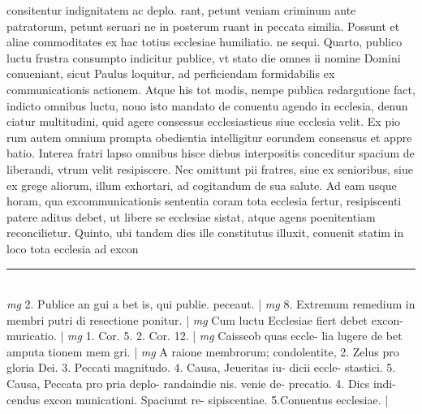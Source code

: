 \documentclass{article}
\begin{document}
\begin{pages}
consitentur indignitatem ac deplo. rant, petunt veniam criminum ante patratorum, petunt seruari ne in posterum ruant in peccata similia. Possunt et aliae commoditates ex hac totius ecclesiae humiliatio. ne sequi.  \pend\pstart Quarto, publico luctu frustra consumpto indicitur publice, vt stato die omnes ii nomine Domini conueniant, sicut Paulus loquitur, ad perficiendam formidabilis ex communicationis actionem. Atque  his tot modis, nempe publica redargutione fact, indicto omnibus luctu, nouo isto mandato de conuentu agendo in ecclesia, denun ciatur multitudini, quid agere consessus ecclesiastieus siue ecclesia velit. Ex pio rum autem omnium prompta obedientia intelligitur eorundem consensus et appre batio. Interea fratri lapso omnibus hisce diebus interpositis conceditur spacium de liberandi, vtrum velit resipiscere. Nec omittunt pii fratres, siue ex senioribus, siue ex grege aliorum, illum exhortari, ad cogitandum de sua salute. Ad eam usque  horam, qua excommunicationis sententia coram tota ecclesia fertur, resipiscenti patere aditus debet, ut libere se ecclesiae sistat, atque agens poenitentiam reconcilietur. Quinto, ubi tandem dies ille constitutus illuxit, conuenit statim in loco tota ecclesia ad excon  \pend
\vspace{0.5cm}\noindent
\vspace{0.2cm}\rule{1cm}{0.2pt}\\ 
\hspace{0.2cm}\textit{mg}
\footnotesize 2. Publice an gui a bet is, qui publie. peceaut. 
\normalsize| 
\hspace{0.2cm}\textit{mg}
\footnotesize 8. Extremum remedium in membri putri di resectione ponitur. 
\normalsize| 
\hspace{0.2cm}\textit{mg}
\footnotesize Cum luctu Ecclesiae fiert debet excon- muricatio. 
\normalsize| 
\hspace{0.2cm}\textit{mg}
\footnotesize 1. Cor. 5. 2. Cor. 12. 
\normalsize| 
\hspace{0.2cm}\textit{mg}
\footnotesize Caisseob quas eccle- lia lugere de bet amputa tionem mem gri. 
\normalsize| 
\hspace{0.2cm}\textit{mg}
\footnotesize A raione membrorum; condolentite, 2. Zelus pro gloria Dei. 3. Peccati magnitudo. 4. Causa, Jeueritas iu- dicii eccle- stastici. 5. Causa, Peccata pro pria deplo- randaindie nis. venie de- precatio. 4. Dics indi- cendus excon municationi. Spaciumt re- sipiscentiae. 5.Conuentus ecclesiae. 
\normalsize| 

\end{pages}
\end{document}
